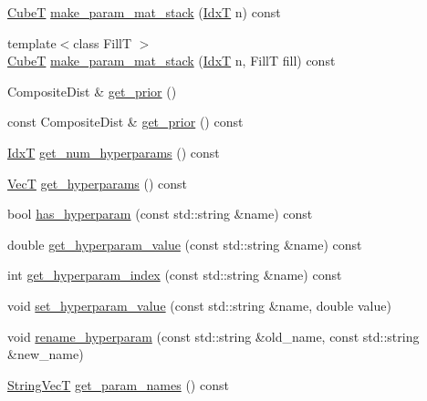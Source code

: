 \begin{DoxyCompactItemize}
\hyperlink{namespacemappel_ab2afab4e6c8805e83946670d882768c2}{CubeT} \hyperlink{classmappel_1_1PointEmitterModel_a57b98d5f8b2b5ed2c455bbf76b632f87}{make\+\_\+param\+\_\+mat\+\_\+stack} (\hyperlink{namespacemappel_ab17ec0f30b61ece292439d7ece81d3a8}{IdxT} n) const 
\item 
{\footnotesize template$<$class FillT $>$ }\\\hyperlink{namespacemappel_ab2afab4e6c8805e83946670d882768c2}{CubeT} \hyperlink{classmappel_1_1PointEmitterModel_a2c11fa045187c7ea9ba382141b5d53c1}{make\+\_\+param\+\_\+mat\+\_\+stack} (\hyperlink{namespacemappel_ab17ec0f30b61ece292439d7ece81d3a8}{IdxT} n, FillT fill) const 
\item 
Composite\+Dist \& \hyperlink{classmappel_1_1PointEmitterModel_a2182c250c15d590b582e76594e5f06b9}{get\+\_\+prior} ()
\item 
const Composite\+Dist \& \hyperlink{classmappel_1_1PointEmitterModel_a239826b8e6b914c0cdaa293f1f5ddfd4}{get\+\_\+prior} () const 
\item 
\hyperlink{namespacemappel_ab17ec0f30b61ece292439d7ece81d3a8}{IdxT} \hyperlink{classmappel_1_1PointEmitterModel_a442522cdaaa76be15b00a4f25110d7ec}{get\+\_\+num\+\_\+hyperparams} () const 
\item 
\hyperlink{namespacemappel_a2225ad69f358daa3f4f99282a35b9a3a}{VecT} \hyperlink{classmappel_1_1PointEmitterModel_a4085ade54f4b039c647bc9bf7804e007}{get\+\_\+hyperparams} () const 
\item 
bool \hyperlink{classmappel_1_1PointEmitterModel_afba2b17a81a506b0acd41616c8604412}{has\+\_\+hyperparam} (const std\+::string \&name) const 
\item 
double \hyperlink{classmappel_1_1PointEmitterModel_a3282cc59d5c6010a51f671ba72997705}{get\+\_\+hyperparam\+\_\+value} (const std\+::string \&name) const 
\item 
int \hyperlink{classmappel_1_1PointEmitterModel_ae13aa99689266d870b659d1045d595f1}{get\+\_\+hyperparam\+\_\+index} (const std\+::string \&name) const 
\item 
void \hyperlink{classmappel_1_1PointEmitterModel_ade3e56cc00c43e9b7a521d8c4778d3b7}{set\+\_\+hyperparam\+\_\+value} (const std\+::string \&name, double value)
\item 
void \hyperlink{classmappel_1_1PointEmitterModel_a447c83f0769e6dea2bfad68d957287d0}{rename\+\_\+hyperparam} (const std\+::string \&old\+\_\+name, const std\+::string \&new\+\_\+name)
\item 
\hyperlink{namespacemappel_aae88cf18bccfbb789a6019bcfbbfca68}{String\+VecT} \hyperlink{classmappel_1_1PointEmitterModel_aa910d1137d808041c0601f2dd3db96f0}{get\+\_\+param\+\_\+names} () const 

\end{DoxyCompactItemize}
